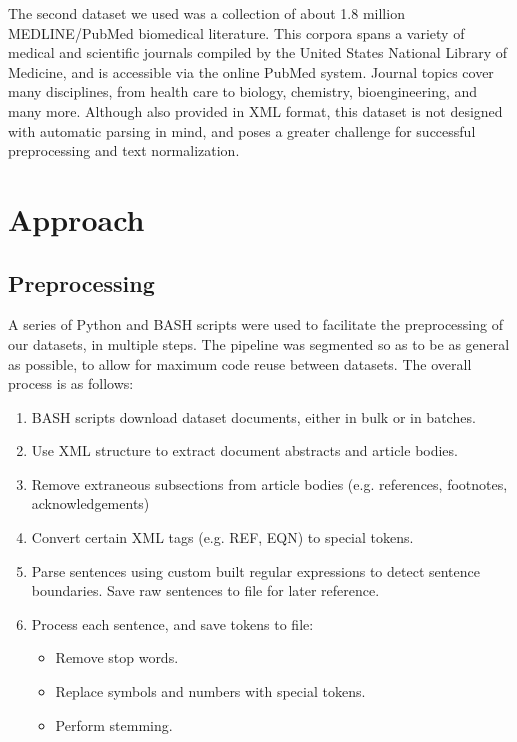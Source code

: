 \documentclass[11pt]{article}
\begin{document}
	The second dataset we used was a collection of about 1.8 million MEDLINE/PubMed biomedical literature. This corpora spans a variety of medical and scientific journals compiled by the United States National Library of Medicine, and is accessible via the online PubMed system. Journal topics cover many disciplines, from health care to biology, chemistry, bioengineering, and many more. Although also provided in XML format, this dataset is not designed with automatic parsing in mind, and poses a greater challenge for successful preprocessing and text normalization.

\section{Approach}
	\subsection{Preprocessing} %
		A series of Python and BASH scripts were used to facilitate the preprocessing of our datasets, in multiple steps. The pipeline was segmented so as to be as general as possible, to allow for maximum code reuse between datasets. The overall process is as follows:
		
		\begin{enumerate}
			\item BASH scripts download dataset documents, either in bulk or in batches.
			\item Use XML structure to extract document abstracts and article bodies. 
			\item Remove extraneous subsections from article bodies (e.g. references, footnotes, acknowledgements)
			\item Convert certain XML tags (e.g. REF, EQN) to special tokens.
			\item Parse sentences using custom built regular expressions to detect sentence boundaries. Save raw sentences to file for later reference.
			\item Process each sentence, and save tokens to file:
			\begin{itemize}
				\item Remove stop words.
				\item Replace symbols and numbers with special tokens.
				\item Perform stemming.
			\end{itemize}
		\end{enumerate}
\end{document}
